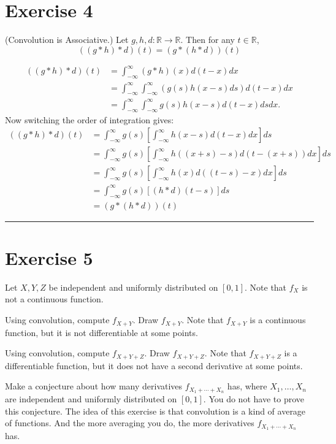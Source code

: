 \documentclass{article}
\theoremstyle{break}
\renewenvironment{proof}{{\bf Proof:}}{\hfill\rule{2mm}{2mm}}
\newcommand{\R}{\mathbb{R}}
\begin{document}
\section*{Exercise 4}
(Convolution is Associative.)
Let $g,h,d\colon\R\to\R$.  Then for any $t\in\R$,
$$((g*h)*d)(t)=(g*(h*d))(t)$$


\begin{proof}

\begin{align*}
((g \ast h) \ast d)(t)&= \int_{-\infty}^\infty (g \ast h)(x) d(t-x) dx \\
	&= \int_{-\infty}^\infty \int_{-\infty}^\infty (g(s) h(x-s) ds ) d(t-x) dx \\
	&= \int_{-\infty}^\infty \int_{-\infty}^\infty g(s) h(x-s) d(t-x) ds dx.
\end{align*}
Now switching the order of integration gives:
\begin{align*}
((g \ast h) \ast d)(t)&= \int_{-\infty}^\infty g(s) \left[ \int_{-\infty}^\infty h(x-s) d(t-x) dx \right] ds \\
	&= \int_{-\infty}^\infty g(s) \left[ \int_{-\infty}^\infty h((x+s)-s) d(t-(x+s)) dx \right] ds \\
	&= \int_{-\infty}^\infty g(s) \left[ \int_{-\infty}^\infty h(x) d((t-s)-x) dx \right] ds \\
	&= \int_{-\infty}^\infty g(s) \left[ (h \ast d)(t - s) \right] ds \\
	&= (g*(h*d))(t)
\end{align*}
\end{proof}

\section*{Exercise 5}
Let $X,Y,Z$ be independent and uniformly distributed on $[0,1]$.  Note that $f_{X}$ is not a continuous function.

Using convolution, compute $f_{X+Y}$.  Draw $f_{X+Y}$.  Note that $f_{X+Y}$ is a continuous function, but it is not differentiable at some points.

Using convolution, compute $f_{X+Y+Z}$.  Draw $f_{X+Y+Z}$.  Note that $f_{X+Y+Z}$ is a differentiable function, but it does not have a second derivative at some points.

Make a conjecture about how many derivatives $f_{X_{1}+\cdots+X_{n}}$ has, where $X_{1},\ldots,X_{n}$ are independent and uniformly distributed on $[0,1]$.  You do not have to prove this conjecture.  The idea of this exercise is that convolution is a kind of average of functions.  And the more averaging you do, the more derivatives $f_{X_{1}+\cdots+X_{n}}$ has.
\end{document}
